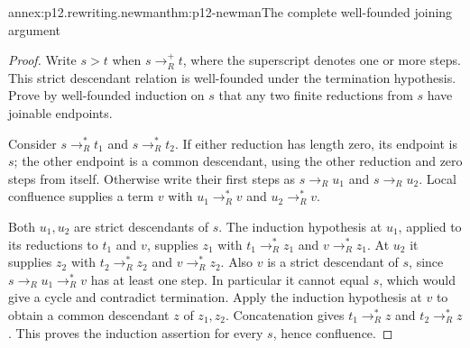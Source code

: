 \begin{annexitem}{annex:p12.rewriting.newman}{thm:p12-newman}{The complete well-founded joining argument}
\begin{proof}
Write \(s>t\) when \(s\to_R^+t\), where the superscript denotes
one or more steps. This strict descendant relation is well-founded
under the termination hypothesis. Prove by well-founded induction on
\(s\) that any two finite reductions from \(s\) have joinable
endpoints.

Consider \(s\to_R^*t_1\) and \(s\to_R^*t_2\). If either
reduction has length zero, its endpoint is \(s\); the other endpoint
is a common descendant, using the other reduction and zero steps from
itself. Otherwise write their first steps as \(s\to_R u_1\) and
\(s\to_R u_2\). Local confluence supplies a term \(v\) with
\(u_1\to_R^*v\) and \(u_2\to_R^*v\).

Both \(u_1,u_2\) are strict descendants of \(s\). The induction
hypothesis at \(u_1\), applied to its reductions to \(t_1\) and
\(v\), supplies \(z_1\) with
\(t_1\to_R^*z_1\) and \(v\to_R^*z_1\). At \(u_2\) it
supplies \(z_2\) with \(t_2\to_R^*z_2\) and
\(v\to_R^*z_2\). Also \(v\) is a strict descendant of \(s\),
since \(s\to_R u_1\to_R^*v\) has at least one step. In
particular it cannot equal \(s\), which would give a cycle and
contradict termination. Apply the induction hypothesis at \(v\)
to obtain a common descendant \(z\) of \(z_1,z_2\).
Concatenation gives \(t_1\to_R^*z\) and \(t_2\to_R^*z\).
This proves the induction assertion for every \(s\), hence confluence.
\end{proof}
\end{annexitem}

